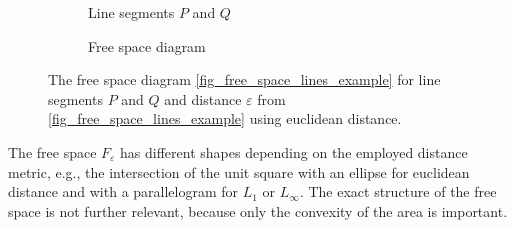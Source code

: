 \documentclass[
oneside,
fontsize=11pt
]{scrartcl}
\begin{document}
\begin{figure}[ht]
  \centering
  \begin{subfigure}[b]{0.45\textwidth}
      \caption{Line segments $P$ and $Q$}
      \label{fig_free_space_lines_example}
  \end{subfigure}
  \hfill
  \begin{subfigure}[b]{0.45\textwidth}
      \caption{Free space diagram}
      \label{fig_free_space_diagram_example}
  \end{subfigure}
  \caption[Free space diagram example]{
    The free space diagram \autoref{fig_free_space_lines_example} 
    for line segments $P$ and $Q$ and distance $\varepsilon$
    from \autoref{fig_free_space_lines_example} using euclidean distance.}
  \label{fig_free_space}
\end{figure}

The free space $F_\varepsilon$ has different shapes depending on the employed distance metric,
e.g.,  the intersection of the unit square with an ellipse for euclidean distance 
and with a parallelogram for $L_1$ or $L_\infty$. 
The exact structure of the free space is not further relevant, 
because only the convexity of the area is important. \cite{alt_computing_1995}
\end{document}
